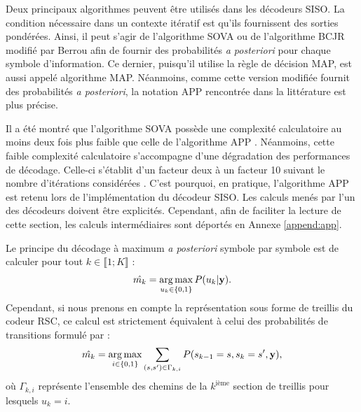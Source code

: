 Deux principaux algorithmes peuvent être utilisés dans les décodeurs SISO. La condition nécessaire dans un contexte itératif 
est qu'ils fournissent des sorties pondérées. Ainsi, il peut s'agir de l'algorithme SOVA ou de l'algorithme BCJR modifié 
par Berrou \cite{berrouTC} afin de fournir des probabilités \textit{a posteriori} pour chaque symbole d'information. Ce 
dernier, puisqu'il utilise la règle de décision MAP, est aussi appelé  algorithme MAP. Néanmoins, comme cette version 
modifiée fournit des probabilités \textit{a posteriori}, la notation APP rencontrée dans la littérature est plus précise.

Il a été montré que l'algorithme SOVA possède une complexité calculatoire au moins deux fois plus faible que celle de 
l'algorithme APP \cite{robertson1995comparison}. Néanmoins, cette faible complexité calculatoire s'accompagne d'une 
dégradation des performances de décodage. Celle-ci s’établit d'un facteur deux à un facteur 10 suivant le nombre d'itérations
considérées \cite{oscarThese}. C'est pourquoi, en pratique, l'algorithme APP est retenu lors de l'implémentation 
du décodeur SISO. Les calculs menés par l'un des décodeurs doivent être explicités. Cependant, afin de faciliter la 
lecture de cette section, les calculs intermédiaires sont déportés en Annexe \ref{append:app}.

Le principe du décodage à maximum \textit{a posteriori} symbole par symbole est de calculer pour tout $k\in \llbracket1;K\rrbracket$ : 
\begin{equation}
	\label{eq:maprule}
	\hat{m_k} = \operatorname*{arg\,max}\limits_{u_k\in\{0,1\}} P(u_k| \mathbf{y}).	
\end{equation}
Cependant, si nous prenons en compte la représentation sous forme de treillis du codeur RSC, ce calcul est strictement 
équivalent à celui des probabilités de transitions formulé par : 
\[\hat{m_k} = \operatorname*{arg\,max}_{i\in\{0,1\}} \sum\limits_{(s,s')\in\Gamma_{k,i}}P(s_{k-1}=s, s_{k}=s',\mathbf{y}),\]
où $\Gamma_{k,i}$ représente l'ensemble des chemins de la ${k^\text{ième}}$ section de treillis pour lesquels $u_k=i$. 

